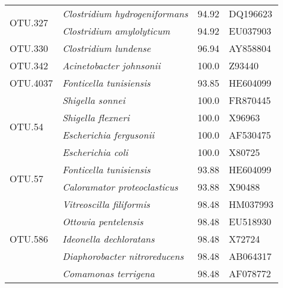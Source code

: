 \begin{table}[H]
{\begin{tabular}{l>{\itshape}lrl}
\multirow{2}{*}{OTU.327} & Clostridium hydrogeniformans & 94.92 & DQ196623 \\  & Clostridium amylolyticum & 94.92 & EU037903 \\ \midrule
\multirow{1}{*}{OTU.330} & Clostridium lundense & 96.94 & AY858804 \\ \midrule
\multirow{1}{*}{OTU.342} & Acinetobacter johnsonii & 100.0 & Z93440 \\ \midrule
\multirow{1}{*}{OTU.4037} & Fonticella tunisiensis & 93.85 & HE604099 \\ \midrule
\multirow{4}{*}{OTU.54} & Shigella sonnei & 100.0 & FR870445 \\  & Shigella flexneri & 100.0 & X96963 \\  & Escherichia fergusonii & 100.0 & AF530475 \\  & Escherichia coli & 100.0 & X80725 \\ \midrule
\multirow{2}{*}{OTU.57} & Fonticella tunisiensis & 93.88 & HE604099 \\  & Caloramator proteoclasticus & 93.88 & X90488 \\ \midrule
\multirow{5}{*}{OTU.586} & Vitreoscilla filiformis & 98.48 & HM037993 \\  & Ottowia pentelensis & 98.48 & EU518930 \\  & Ideonella dechloratans & 98.48 & X72724 \\  & Diaphorobacter nitroreducens & 98.48 & AB064317 \\  & Comamonas terrigena & 98.48 & AF078772 \\ \midrule

    \bottomrule
\end{tabular}}{}
\end{table}
